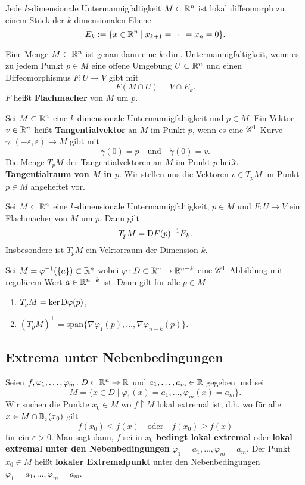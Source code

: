 Jede $k$-dimensionale Untermannigfaltigkeit $M \subset \mathbb{R}^n$ ist lokal diffeomorph zu einem Stück der $k$-dimensionalen Ebene
\[E_k := \{x \in \mathbb{R}^n \mid x_{k+1} = \dots = x_n = 0\}.\]
\begin{satz}\label{satz1_8}
	Eine Menge $M \subset \mathbb{R}^n$ ist genau dann eine $k$-dim. Untermannigfaltigkeit, wenn es zu jedem Punkt $p \in M$ eine offene Umgebung $U \subset \mathbb{R}^n$ und einen Diffeomorphismus $F \colon U \to V$ gibt mit
	\[F(M\cap U) = V \cap E_k.\]
	$F$ heißt \textbf{Flachmacher} von $M$ um $p$.
\end{satz}
Sei $M \subset \mathbb{R}^n$ eine $k$-dimensionale Untermannigfaltigkeit und $p \in M$. Ein Vektor $v \in \mathbb{R}^n$ heißt \textbf{Tangentialvektor} an $M$ im Punkt $p$, wenn es eine $\mathscr{C}^1$-Kurve $\gamma \colon (-\varepsilon, \varepsilon) \to M$ gibt mit
\[\gamma(0) = p\quad\text{und}\quad \dot{\gamma}(0) = v.\]
Die Menge $T_pM$ der Tangentialvektoren an $M$ im Punkt $p$ heißt \textbf{Tangentialraum von $M$ in $p$}. Wir stellen uns die Vektoren $v \in T_pM$ im Punkt $p \in M$ angeheftet vor.

\begin{satz}\label{satz1_9}
	Sei $M \subset \mathbb{R}^n$ eine $k$-dimensionale Untermannigfaltigkeit, $p \in M$ und $F \colon U \to V$ ein Flachmacher von $M$ um $p$. Dann gilt
	\[T_pM = \mathrm{D} F(p)^{-1} E_k.\]
	Insbesondere ist $T_p M$ ein Vektorraum der Dimension $k$.
\end{satz}
\begin{satz}\label{satz1_10}
	Sei $M = \varphi^{-1}(\{a\}) \subset \mathbb{R}^n$ wobei $\varphi \colon D \subset \mathbb{R}^n \to \mathbb{R}^{n-k}$ eine $\mathscr{C}^1$-Abbildung mit regulärem Wert $a \in \mathbb{R}^{n-k}$ ist. Dann gilt für alle $p \in M$
	\begin{enumerate}[label=(\alph*)]
		\item $T_pM = \ker \mathrm{D} \varphi(p)$,
		\item $(T_p M)^\perp = \mathrm{span}\{\nabla \varphi_1 (p), \dots, \nabla \varphi_{n-k}(p)\}$.
	\end{enumerate}
\end{satz}

\subsection{Extrema unter Nebenbedingungen}
Seien $f, \varphi_1, \dots, \varphi_m \colon D \subset \mathbb{R}^n \to \mathbb{R}$ und $a_1, \dots, a_m \in \mathbb{R}$ gegeben und sei
\[M = \{x \in D \mid \varphi_1(x) = a_1, \dots, \varphi_m(x) = a_m\}.\]
Wir suchen die Punkte $x_0 \in M$ wo $f\restriction M$ lokal extremal ist, d.h. wo für alle $x \in M \cap \mathbb{B}_\varepsilon (x_0)$ gilt
\[f(x_0) \leq f(x) \quad\text{oder}\quad f(x_0) \geq f(x)\]
für ein $\varepsilon > 0$. Man sagt dann, $f$ sei in $x_0$ \textbf{bedingt lokal extremal} oder \textbf{lokal extremal unter den Nebenbedingungen} $\varphi_1 = a_1, \dots, \varphi_m = a_m$. Der Punkt $x_0 \in M$ heißt \textbf{lokaler Extremalpunkt} unter den Nebenbedingungen $\varphi_1 = a_1, \dots, \varphi_m = a_m$.

